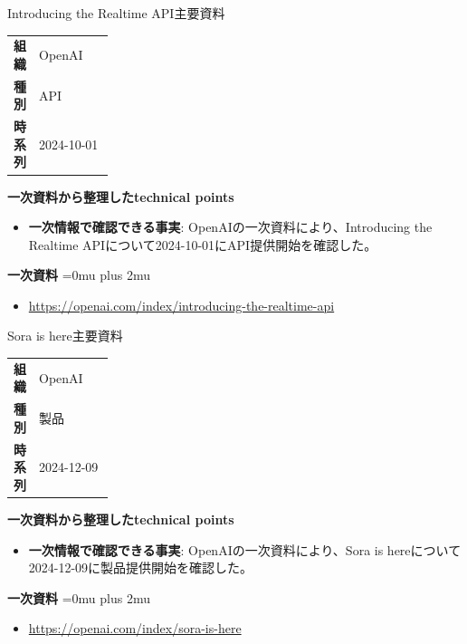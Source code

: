 \begin{technicalnote}{Introducing the Realtime API}{主要資料}
\begingroup
\begin{tabularx}{\linewidth}{@{}>{\bfseries}p{0.22\linewidth}X@{}}
組織 & OpenAI \\
種別 & API \\
時系列 & 2024-10-01 \\
\end{tabularx}
\smallskip
{\bfseries 一次資料から整理したtechnical points}
\begin{itemize}[leftmargin=1.5em,itemsep=0.35em]
\item \textbf{一次情報で確認できる事実}: OpenAIの一次資料により、Introducing the Realtime APIについて2024-10-01にAPI提供開始を確認した。
\end{itemize}
\begin{minipage}{\linewidth}
\begin{samepage}
{\bfseries 一次資料}
\begingroup\sloppy
\Urlmuskip=0mu plus 2mu\relax
\begin{itemize}[leftmargin=1.5em,itemsep=0.25em]
\item {\scriptsize\url{https://openai.com/index/introducing-the-realtime-api}}
\end{itemize}
\endgroup
\end{samepage}
\end{minipage}
\endgroup
\end{technicalnote}
\medskip

\begin{technicalnote}{Sora is here}{主要資料}
\begingroup
\begin{tabularx}{\linewidth}{@{}>{\bfseries}p{0.22\linewidth}X@{}}
組織 & OpenAI \\
種別 & 製品 \\
時系列 & 2024-12-09 \\
\end{tabularx}
\smallskip
{\bfseries 一次資料から整理したtechnical points}
\begin{itemize}[leftmargin=1.5em,itemsep=0.35em]
\item \textbf{一次情報で確認できる事実}: OpenAIの一次資料により、Sora is hereについて2024-12-09に製品提供開始を確認した。
\end{itemize}
\begin{minipage}{\linewidth}
\begin{samepage}
{\bfseries 一次資料}
\begingroup\sloppy
\Urlmuskip=0mu plus 2mu\relax
\begin{itemize}[leftmargin=1.5em,itemsep=0.25em]
\item {\scriptsize\url{https://openai.com/index/sora-is-here}}
\end{itemize}
\endgroup
\end{samepage}
\end{minipage}
\endgroup
\end{technicalnote}
\medskip

